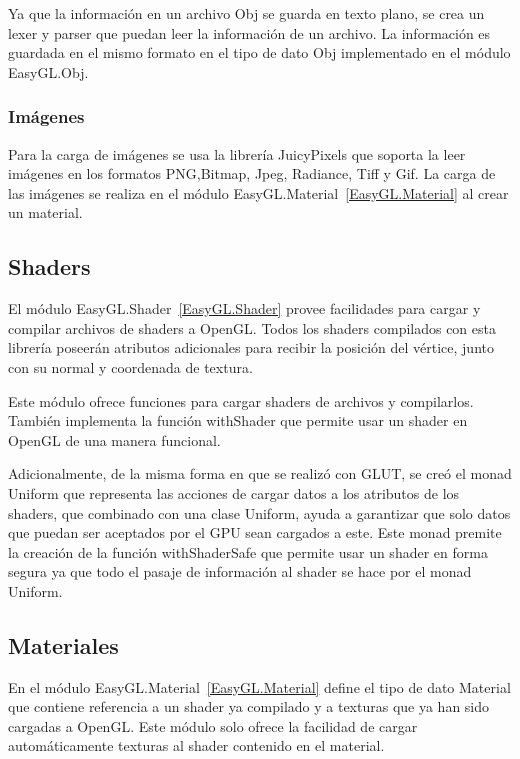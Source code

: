 Ya que la información en un archivo Obj se guarda en texto plano, se crea un lexer y parser que puedan leer la información de un archivo. La información es guardada en el mismo formato en el tipo de dato Obj implementado en el módulo EasyGL.Obj.

\subsubsection{Imágenes}

Para la carga de imágenes se usa la librería JuicyPixels \cite{libreria:JuicyPixels} que soporta la leer imágenes en los formatos PNG,Bitmap, Jpeg, Radiance, Tiff y Gif. La carga de las imágenes se realiza en el módulo EasyGL.Material~\ref{EasyGL.Material} al crear un material.

\subsection{Shaders}

El módulo EasyGL.Shader~\ref{EasyGL.Shader} provee facilidades para cargar y compilar archivos de shaders a OpenGL. Todos los shaders compilados con esta librería poseerán atributos adicionales para recibir la posición del vértice, junto con su normal y coordenada de textura.

Este módulo ofrece funciones para cargar shaders de archivos y compilarlos. También implementa la función withShader que permite usar un shader en OpenGL de una manera funcional.

Adicionalmente, de la misma forma en que se realizó con GLUT,  se creó el monad Uniform que representa las acciones de cargar datos a los atributos de los shaders, que combinado con una clase Uniform, ayuda a garantizar que solo datos que puedan ser aceptados por el GPU sean cargados a este. Este monad premite la creación de la función withShaderSafe que permite usar un shader en forma segura ya que todo el pasaje de información al shader se hace por el monad Uniform.

\subsection{Materiales}

En el módulo EasyGL.Material~\ref{EasyGL.Material} define el tipo de dato Material que contiene referencia a un shader ya compilado y a texturas que ya han sido cargadas a OpenGL. Este módulo solo ofrece la facilidad de cargar automáticamente texturas al shader contenido en el material.

